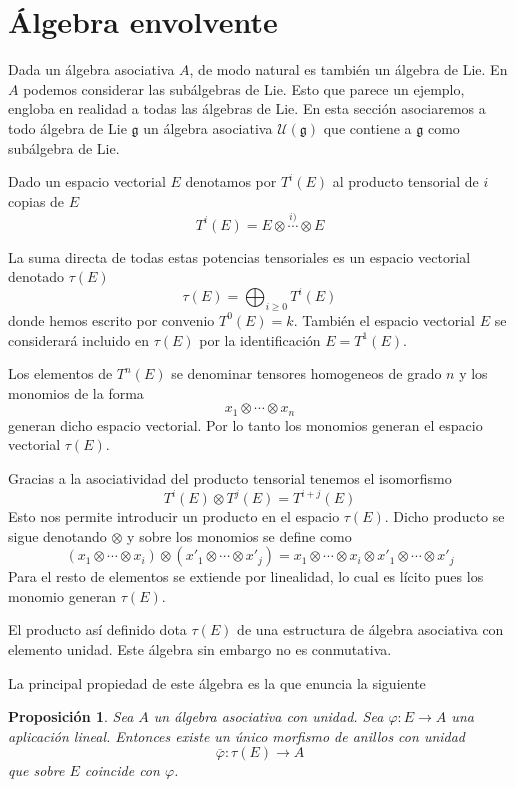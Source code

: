 \documentclass[a4paper,draft,12pt]{scrartcl}
\newtheorem{propo}[teo]{Proposición}%
\newcommand{\uni}{\mathcal{U}}%
\newcommand{\lto}{\longrightarrow}%
\begin{document}
\section{Álgebra envolvente}

Dada un álgebra asociativa $A$, de modo natural es también un álgebra de Lie.  En $A$ podemos considerar las subálgebras de Lie.  Esto que parece un ejemplo, engloba en realidad a todas las álgebras de Lie.  En esta sección asociaremos a todo álgebra de Lie $\mathfrak{g}$ un álgebra asociativa $\uni(\mathfrak{g})$ que contiene a $\mathfrak{g}$ como subálgebra de Lie.

\bigskip

Dado un espacio vectorial $E$ denotamos por $T^i(E)$ al producto tensorial de $i$ copias de $E$
$$
T^i(E)= E \otimes \stackrel{i)}{\cdots}\otimes E
$$

La suma directa de todas estas potencias tensoriales es un espacio vectorial denotado $\tau(E)$
$$
\tau(E) = \bigoplus_{i \geq 0} T^i (E)
$$
donde hemos escrito por convenio $T^0(E)=k$.  También el espacio vectorial $E$ se considerará incluido en $\tau(E)$ por la identificación $E= T^1(E)$.

Los elementos de $T^n(E)$ se denominar tensores homogeneos de grado $n$ y los monomios de la forma
$$
x_1 \otimes \cdots \otimes x_n
$$
generan dicho espacio vectorial.  Por lo tanto los monomios generan el espacio vectorial $\tau(E)$.

Gracias a la asociatividad del producto tensorial tenemos el isomorfismo
$$
T^i(E)  \otimes T^j(E)= T^{i+j}(E)
$$
Esto nos permite introducir un producto en el espacio $\tau(E)$.  Dicho producto se sigue denotando $\otimes$ y sobre los monomios se define como
$$
(x_1\otimes \cdots\otimes x_i) \otimes (x'_1 \otimes \cdots \otimes x'_j)= x_1 \otimes \cdots \otimes x_i \otimes x'_1 \otimes \cdots \otimes x'_j
$$
Para el resto de elementos se extiende por linealidad, lo cual es lícito pues los monomio generan $\tau(E)$.

El producto así definido dota $\tau(E)$ de una estructura de álgebra asociativa con elemento unidad.  Este álgebra sin embargo no es conmutativa.

La principal propiedad de este álgebra es la que enuncia la siguiente

\begin{propo}

Sea $A$ un álgebra asociativa con unidad.  Sea $\varphi:E \rightarrow A$ una aplicación lineal.  Entonces existe un único morfismo de anillos con unidad
$$
\overline{\varphi}: \tau(E) \lto A
$$
que sobre $E$ coincide con $\varphi$.

\end{propo}
\end{document}
